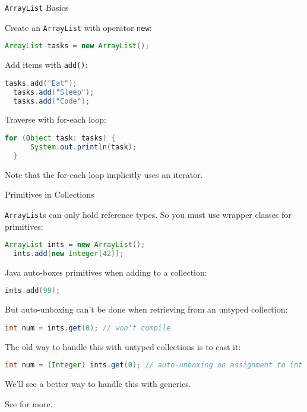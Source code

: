 \documentclass{beamer}
\begin{document}
\begin{frame}[fragile]{{\tt ArrayList} Basics}


Create an {\tt ArrayList} with operator {\tt new}:
\begin{lstlisting}[language=Java]
  ArrayList tasks = new ArrayList();
\end{lstlisting}
Add items with {\tt add()}:
\begin{lstlisting}[language=Java]
  tasks.add("Eat");
  tasks.add("Sleep");
  tasks.add("Code");
\end{lstlisting}
Traverse with for-each loop:
\begin{lstlisting}[language=Java]
  for (Object task: tasks) {
      System.out.println(task);
  }
\end{lstlisting}

Note that the for-each loop implicitly uses an iterator.

\end{frame}
\begin{frame}[fragile]{Primitives in Collections}

{\tt ArrayList}s can only hold reference types.  So you must use wrapper classes for primitives:
\begin{lstlisting}[language=Java]
  ArrayList ints = new ArrayList();
  ints.add(new Integer(42));
\end{lstlisting}
Java auto-boxes primitives when adding to a collection:
\begin{lstlisting}[language=Java]
  ints.add(99);
\end{lstlisting}
But auto-unboxing can't be done when retrieving from an untyped collection:
\begin{lstlisting}[language=Java]
  int num = ints.get(0); // won't compile
\end{lstlisting}
The old way to handle this with untyped collections is to cast it:
\begin{lstlisting}[language=Java]
int num = (Integer) ints.get(0); // auto-unboxing on assignment to int
\end{lstlisting}
We'll see a better way to handle this with generics.

See  for more.
\end{frame}
\end{document}
